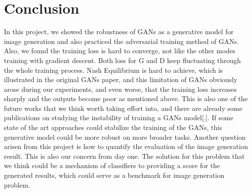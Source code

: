 \documentclass[10pt,twocolumn,letterpaper]{article}
\begin{document}
\section{Conclusion}
In this project, we showed the robustness of GANs as a generative model for image generation and also practiced the adversarial training method of GANs. Also, we found the training loss is hard to converge, not like the other modes training with gradient descent. Both loss for G and D keep fluctuating through the whole training process. Nash Equilibrium is hard to achieve, which is illustrated in the original GANs paper, and this limitation of GANs obviously arose during our experiments, and even worse, that the training loss increases sharply and the outputs become poor as mentioned above. This is also one of the future works that we think worth taking effort into, and there are already some publications on studying the instability of training a GANs model[.]. If some state of the art approaches could stabilize the training of the GANs, this generative model could be more robust on more broader tasks. Another question arisen from this project is how to quantify the evaluation of the image generation result. This is also our concern from day one. The solution for this problem that we think could be a mechanism of classifiers to providing a score for the generated results, which could serve as a benchmark for image generation problem.
{\small


}
\end{document}
